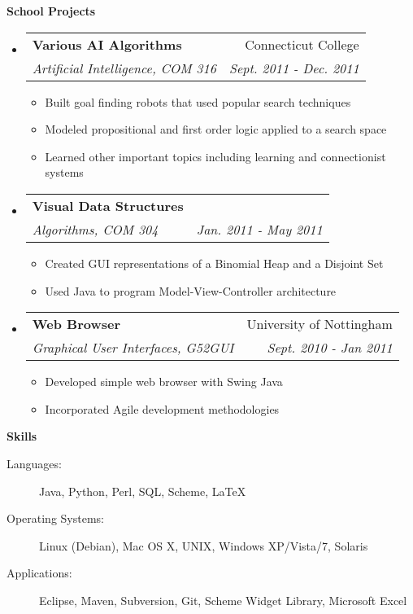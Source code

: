 \documentclass[letterpaper,11pt]{article}
\makeatletter
\newcommand{\resitem}[1]{\item #1 \vspace{-2pt}}
\newcommand{\resheading}[1]{{\large \colorbox{mygrey}{\begin{minipage}{\textwidth}{\textbf{#1 \vphantom{p\^{E}}}}\end{minipage}}}}
\newcommand{\ressubheading}[4]{
\begin{tabular*}{7.0in}{l@{\extracolsep{\fill}}r}
		\textbf{#1} & #2 \\
		\textit{#3} & \textit{#4} \\
\end{tabular*}\vspace{-6pt}}
\makeatother
\begin{document}
\resheading{School Projects}
\begin{itemize}
	\item
	\ressubheading{Various AI Algorithms}{Connecticut College}{Artificial Intelligence, COM 316}{Sept. 2011 - Dec. 2011}
	\begin{itemize}
		\resitem{Built goal finding robots that used popular search techniques}
		\resitem{Modeled propositional and first order logic applied to a search space}
		\resitem{Learned other important topics including learning and connectionist systems}
	\end{itemize}
	
	\item
	\ressubheading{Visual Data Structures}{}{Algorithms, COM 304}{Jan. 2011 - May 2011}
	\begin{itemize}
		\resitem{Created GUI representations of a Binomial Heap and a Disjoint Set}
		\resitem{Used Java to program Model-View-Controller architecture}
	\end{itemize}

	\item
	\ressubheading{Web Browser}{University of Nottingham}{Graphical User Interfaces, G52GUI}{Sept. 2010 - Jan 2011}
	\begin{itemize}
		\resitem{Developed simple web browser with Swing Java}
		\resitem{Incorporated Agile development methodologies}
	\end{itemize}
\end{itemize}

\resheading{Skills}
\begin{description}
	\item[Languages:]
		Java, Python, Perl, SQL, Scheme, \LaTeX
	\item[Operating Systems:]
		Linux (Debian), Mac OS X, {\sc UNIX}, Windows XP/Vista/7, Solaris
	\item[Applications:]
		Eclipse, Maven, Subversion, Git, Scheme Widget Library, Microsoft Excel
\end{description}
\end{document}
